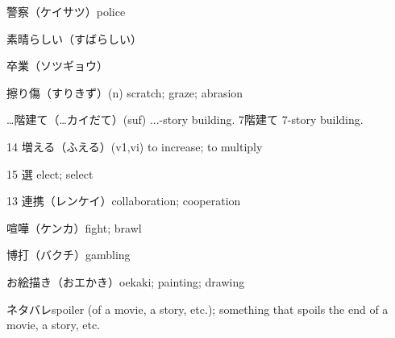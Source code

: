警察（ケイサツ）police

素晴らしい（すばらしい）

卒業（ソツギョウ）

擦り傷（すりきず）(n) scratch; graze; abrasion

…階建て（…カイだて）(suf) ...-story building.
7階建て 7-story building.

14 増える（ふえる）(v1,vi) to increase; to multiply

15 選 elect; select

13 連携（レンケイ）collaboration; cooperation

喧嘩（ケンカ）fight; brawl

博打（バクチ）gambling

お絵描き（おエかき）oekaki; painting; drawing

ネタバレspoiler (of a movie, a story, etc.); something that spoils the end of a movie, a story, etc.

